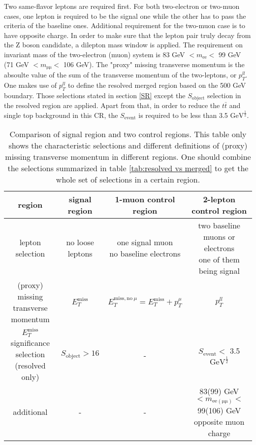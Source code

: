 \documentclass[class=NCU_thesis, crop=false]{standalone}
\begin{document}
			Two same-flavor leptons are required first. For both two-electron or two-muon cases, one lepton is required to be the signal one while the other has to pass the criteria of the baseline ones. Additional requirement for the two-muon case is to have opposite charge. In order to make sure that the lepton pair truly decay from the Z boson candidate, a dilepton mass window is applied. The requirement on invariant mass of the two-electron (muon) system is 83 GeV $< m_{\mathrm{ee}} <$ 99 GeV (71 GeV $< m_{\mathrm{\mu \mu}} <$ 106 GeV). The "proxy" missing transverse momentum is the absoulte value of the sum of the transverse momentum of the two-leptons, or $p_T^{ll}$. One makes use of $p_T^{ll}$ to define the resolved merged region based on the 500 GeV boundary. Those selections stated in section \ref{SR} except the $S_{\mathrm{object}}$ selection in the resolved region are applied. Apart from that, in order to reduce the $t\bar{t}$ and single top background in this CR, the $S_{\mathrm{event}}$ is required to be less than 3.5 $\mathrm{GeV}^\frac{1}{2}$.
		
			\begin{table}[h]
				\caption{Comparison of signal region and two control regions. This table only shows the characteristic selections and different definitions of (proxy) missing transverse momentum in different regions. One should combine the selections summarized in table \ref{tab:resolved vs merged} to get the whole set of selections in a certain region.}
				\label{tab:SR vs CR}
				\begin{tabular}{|c|c|c|c|}
					\hline
					region & signal region & 1-muon control region & 2-lepton control region\\
					\hline
					lepton selection & no loose leptons & \shortstack{one signal muon\\no baseline electrons} & \shortstack{two baseline muons or electrons\\one of them being signal}\\
					\hline
					\shortstack{(proxy) missing\\transverse momentum} & $E_T^{\mathrm{miss}}$ & $E_T^{\mathrm{miss, no}\ \mu} = E_T^{\mathrm{miss}} + p_T^\mu$ & $p_T^{ll}$\\
					\hline
					\shortstack{$E_T^{\mathrm{miss}}$ significance\\selection (resolved only)} & $S_{\mathrm{object}} > 16$ & - & $S_{\mathrm{event}} <$ 3.5 $\mathrm{GeV}^\frac{1}{2}$\\
					\hline
					additional & - & - & \shortstack{83(99) GeV $< m_{\mathrm{ee\left(\mu \mu\right)}} <$ 99(106) GeV\\opposite muon charge}\\
					\hline
				\end{tabular}
			\end{table}
		
\end{document}
